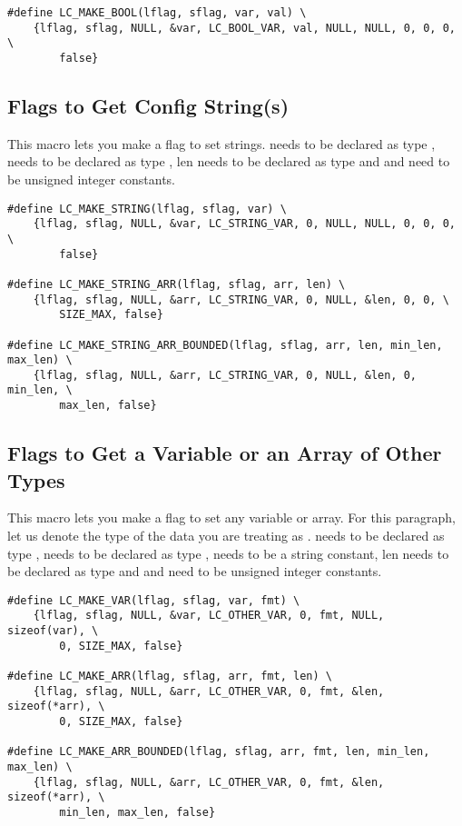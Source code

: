 \begin{verbatim}
#define LC_MAKE_BOOL(lflag, sflag, var, val) \
	{lflag, sflag, NULL, &var, LC_BOOL_VAR, val, NULL, NULL, 0, 0, 0, \
		false}
\end{verbatim}

\subsection{Flags to Get Config String(s)}
This macro lets you make a flag to set strings.  needs to be declared as type ,  needs to be declared as type , len needs to be declared as type  and  and  need to be unsigned integer constants.

\begin{verbatim}
#define LC_MAKE_STRING(lflag, sflag, var) \
	{lflag, sflag, NULL, &var, LC_STRING_VAR, 0, NULL, NULL, 0, 0, 0, \
		false}

#define LC_MAKE_STRING_ARR(lflag, sflag, arr, len) \
	{lflag, sflag, NULL, &arr, LC_STRING_VAR, 0, NULL, &len, 0, 0, \
		SIZE_MAX, false}

#define LC_MAKE_STRING_ARR_BOUNDED(lflag, sflag, arr, len, min_len, max_len) \
	{lflag, sflag, NULL, &arr, LC_STRING_VAR, 0, NULL, &len, 0, min_len, \
		max_len, false}
\end{verbatim}

\subsection{Flags to Get a Variable or an Array of Other Types}
This macro lets you make a flag to set any variable or array. For this paragraph, let us denote the type of the data you are treating as .  needs to be declared as type ,  needs to be declared as type ,  needs to be a string constant, len needs to be declared as type  and  and  need to be unsigned integer constants.

\begin{verbatim}
#define LC_MAKE_VAR(lflag, sflag, var, fmt) \
	{lflag, sflag, NULL, &var, LC_OTHER_VAR, 0, fmt, NULL, sizeof(var), \
		0, SIZE_MAX, false}

#define LC_MAKE_ARR(lflag, sflag, arr, fmt, len) \
	{lflag, sflag, NULL, &arr, LC_OTHER_VAR, 0, fmt, &len, sizeof(*arr), \
		0, SIZE_MAX, false}

#define LC_MAKE_ARR_BOUNDED(lflag, sflag, arr, fmt, len, min_len, max_len) \
	{lflag, sflag, NULL, &arr, LC_OTHER_VAR, 0, fmt, &len, sizeof(*arr), \
		min_len, max_len, false}
\end{verbatim}
